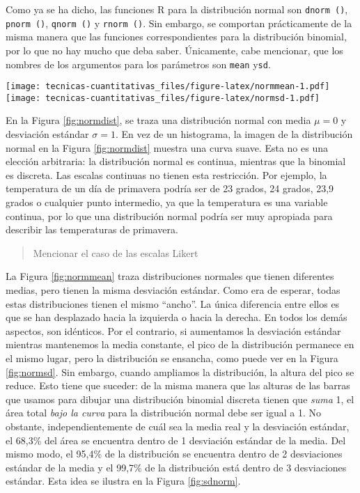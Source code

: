 \documentclass[
]{book}
\begin{document}
Como ya se ha dicho, las funciones R para la distribución normal son \texttt{dnorm\ ()}, \texttt{pnorm\ ()}, \texttt{qnorm\ ()} y \texttt{rnorm\ ()}. Sin embargo, se comportan prácticamente de la misma manera que las funciones correspondientes para la distribución binomial, por lo que no hay mucho que deba saber. Únicamente, cabe mencionar, que los nombres de los argumentos para los parámetros son \texttt{mean} y\texttt{sd}.

\texttt{[image: tecnicas-cuantitativas\_files/figure-latex/normmean-1.pdf]}
\texttt{[image: tecnicas-cuantitativas\_files/figure-latex/normsd-1.pdf]}

En la Figura \ref{fig:normdist}, se traza una distribución normal con media \(\mu=0\) y desviación estándar \(\sigma=1\). En vez de un histograma, la imagen de la distribución normal en la Figura \ref{fig:normdist} muestra una curva suave. Esta no es una elección arbitraria: la distribución normal es continua, mientras que la binomial es discreta. Las escalas continuas no tienen esta restricción. Por ejemplo, la temperatura de un día de primavera podría ser de 23 grados, 24 grados, 23,9 grados o cualquier punto intermedio, ya que la temperatura es una variable continua, por lo que una distribución normal podría ser muy apropiada para describir las temperaturas de primavera.

\begin{quote}
Mencionar el caso de las escalas Likert
\end{quote}

La Figura \ref{fig:normmean} traza distribuciones normales que tienen diferentes medias, pero tienen la misma desviación estándar. Como era de esperar, todas estas distribuciones tienen el mismo ``ancho''. La única diferencia entre ellos es que se han desplazado hacia la izquierda o hacia la derecha. En todos los demás aspectos, son idénticos. Por el contrario, si aumentamos la desviación estándar mientras mantenemos la media constante, el pico de la distribución permanece en el mismo lugar, pero la distribución se ensancha, como puede ver en la Figura \ref{fig:normsd}. Sin embargo, cuando ampliamos la distribución, la altura del pico se reduce. Esto tiene que suceder: de la misma manera que las alturas de las barras que usamos para dibujar una distribución binomial discreta tienen que \emph{suma } 1, el área total \emph{bajo la curva} para la distribución normal debe ser igual a 1. No obstante, independientemente de cuál sea la media real y la desviación estándar, el 68,3\% del área se encuentra dentro de 1 desviación estándar de la media. Del mismo modo, el 95,4\% de la distribución se encuentra dentro de 2 desviaciones estándar de la media y el 99,7\% de la distribución está dentro de 3 desviaciones estándar. Esta idea se ilustra en la Figura \ref{fig:sdnorm}.
\end{document}
